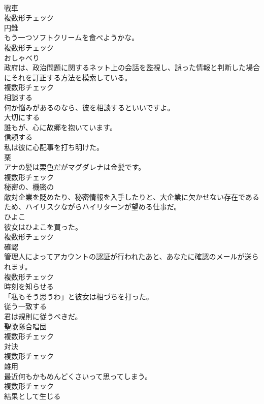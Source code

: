 \documentclass[8pt]{extreport}
\begin{document}
\begin{CJK}{UTF8}{min}
\\	[名詞]	戦車	
\\	複数形チェック
\\	[名詞]	円錐	
\\	もう一つソフトクリームを食べようかな。	
\\	複数形チェック
\\	[名詞]	おしゃべり	
\\	政府は、政治問題に関するネット上の会話を監視し、誤った情報と判断した場合にそれを訂正する方法を模索している。	
\\	複数形チェック
\\	[動詞]	相談する	
\\	何か悩みがあるのなら、彼を相談するといいですよ。	
\\	[動詞]	大切にする	
\\	誰もが、心に故郷を抱いています。	
\\	[動詞]	信頼する	
\\	私は彼に心配事を打ち明けた。	
\\	[名詞]	栗	
\\	アナの髪は栗色だがマグダレナは金髪です。	
\\	複数形チェック
\\	[形容詞]	秘密の、機密の	
\\	敵対企業を貶めたり、秘密情報を入手したりと、大企業に欠かせない存在であるため、ハイリスクながらハイリターンが望める仕事だ。	
\\	[名詞]	ひよこ	
\\	彼女はひよこを買った。	
\\	複数形チェック
\\	[名詞]	確認	
\\	管理人によってアカウントの認証が行われたあと、あなたに確認のメールが送られます。	
\\	複数形チェック
\\	[動詞]	時刻を知らせる	
\\	「私もそう思うわ」と彼女は相づちを打った。	
\\	[動詞]	従う一致する	
\\	君は規則に従うべきだ。	
\\	[名詞]	聖歌隊合唱団	
\\	複数形チェック
\\	[名詞]	対決	
\\	複数形チェック
\\	[名詞]	雑用	
\\	最近何もかもめんどくさいって思ってしまう。	
\\	複数形チェック
\\	[形容詞]	結果として生じる	

\end{CJK}
\end{document}
